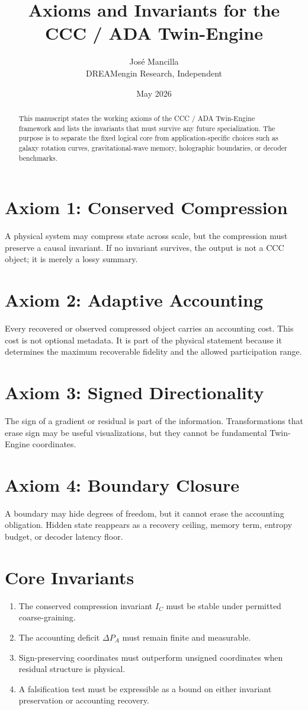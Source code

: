 \documentclass[11pt]{article}
\title{Axioms and Invariants for the CCC / ADA Twin-Engine}
\author{José Mancilla\\DREAMengin Research, Independent}
\date{May 2026}
\begin{document}
\maketitle

\begin{abstract}
This manuscript states the working axioms of the CCC / ADA Twin-Engine framework and lists the invariants that must survive any future specialization. The purpose is to separate the fixed logical core from application-specific choices such as galaxy rotation curves, gravitational-wave memory, holographic boundaries, or decoder benchmarks.
\end{abstract}

\section{Axiom 1: Conserved Compression}
A physical system may compress state across scale, but the compression must preserve a causal invariant. If no invariant survives, the output is not a CCC object; it is merely a lossy summary.

\section{Axiom 2: Adaptive Accounting}
Every recovered or observed compressed object carries an accounting cost. This cost is not optional metadata. It is part of the physical statement because it determines the maximum recoverable fidelity and the allowed participation range.

\section{Axiom 3: Signed Directionality}
The sign of a gradient or residual is part of the information. Transformations that erase sign may be useful visualizations, but they cannot be fundamental Twin-Engine coordinates.

\section{Axiom 4: Boundary Closure}
A boundary may hide degrees of freedom, but it cannot erase the accounting obligation. Hidden state reappears as a recovery ceiling, memory term, entropy budget, or decoder latency floor.

\section{Core Invariants}
\begin{enumerate}[label=\textbf{I\arabic*.}]
\item The conserved compression invariant $I_C$ must be stable under permitted coarse-graining.
\item The accounting deficit $\Delta P_A$ must remain finite and measurable.
\item Sign-preserving coordinates must outperform unsigned coordinates when residual structure is physical.
\item A falsification test must be expressible as a bound on either invariant preservation or accounting recovery.
\end{enumerate}
\end{document}
